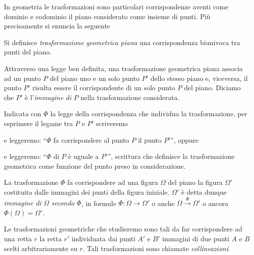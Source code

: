 In geometria le trasformazioni sono particolari corrispondenze aventi 
come dominio e codominio il piano considerato come insieme di punti. 
Più precisamente si enuncia la seguente

\begin{definizione}
Si definisce \emph{trasformazione geometrica piana} una 
corrispondenza biunivoca tra punti del piano.
\end{definizione}

Attraverso una legge ben definita, una trasformazione geometrica 
piana associa ad un punto \(P\) del piano uno e un solo punto \(P'\) 
dello stesso piano e, viceversa, il punto \(P'\) risulta essere il 
corrispondente di un solo punto \(P\) del piano. Diciamo che \(P'\) è 
l'\emph{immagine di \(P\)} nella trasformazione considerata.


Indicata con \(\Phi\) la legge della corrispondenza che individua la 
trasformazione, per esprimere il legame tra \(P\) e \(P'\) scriveremo


\noindent e leggeremo: ``\(\Phi\) fa corrispondere al punto \(P\) il 
punto \(P'\)'', oppure


\noindent e leggeremo: ``\(\Phi\) di \(P\) è uguale a \(P'\)'', scrittura 
che definisce la trasformazione geometrica come funzione del punto 
preso in considerazione.

La trasformazione \(\Phi\) fa corrispondere ad una figura \(\Omega\) del 
piano la figura \(\Omega'\) costituita dalle immagini dei punti della 
figura iniziale. \(\Omega'\) è detta dunque \emph{immagine di \(\Omega\) 
secondo \(\Phi\)}, in formule \(\Phi: \Omega \rightarrow \Omega'\) o 
anche \(\Omega\overset{\Phi}{\rightarrow}\Omega'\) o ancora 
\(\Phi(\Omega)=\Omega'\).

Le trasformazioni geometriche che studieremo sono tali da far 
corrispondere ad una retta \(r\) la retta \(r'\) individuata dai punti 
\(A'\) e \(B'\) immagini di due punti \(A\) e \(B\) scelti arbitrariamente su 
\(r\). Tali trasformazioni sono chiamate \emph{collineazioni}.

